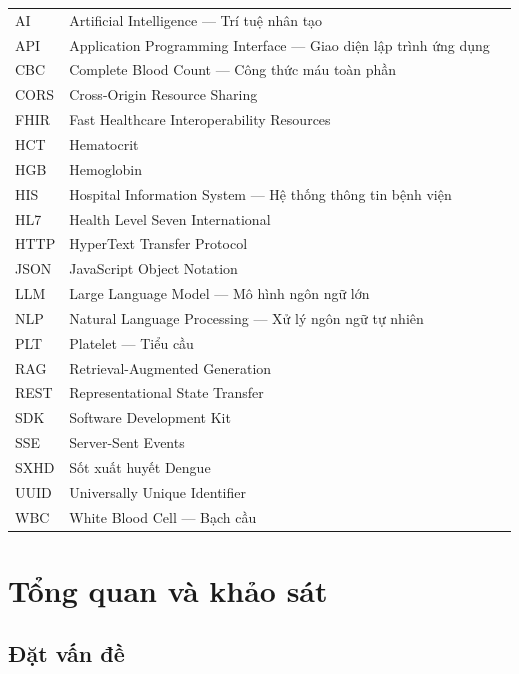 \documentclass[oneside, a4paper]{book}
\theoremstyle{plain}
\theoremstyle{plain}
\theoremstyle{definition}
\theoremstyle{remark}
\begin{document}
\begin{tabular}{@{\hspace{-0.1cm}} l @{\hspace{1.2cm}} p{11.5cm} l}
AI    & Artificial Intelligence --- Trí tuệ nhân tạo \\
API   & Application Programming Interface --- Giao diện lập trình ứng dụng \\
CBC   & Complete Blood Count --- Công thức máu toàn phần \\
CORS  & Cross-Origin Resource Sharing \\
FHIR  & Fast Healthcare Interoperability Resources \\
HCT   & Hematocrit \\
HGB   & Hemoglobin \\
HIS   & Hospital Information System --- Hệ thống thông tin bệnh viện \\
HL7   & Health Level Seven International \\
HTTP  & HyperText Transfer Protocol \\
JSON  & JavaScript Object Notation \\
LLM   & Large Language Model --- Mô hình ngôn ngữ lớn \\
NLP   & Natural Language Processing --- Xử lý ngôn ngữ tự nhiên \\
PLT   & Platelet --- Tiểu cầu \\
RAG   & Retrieval-Augmented Generation \\
REST  & Representational State Transfer \\
SDK   & Software Development Kit \\
SSE   & Server-Sent Events \\
SXHD  & Sốt xuất huyết Dengue \\
UUID  & Universally Unique Identifier \\
WBC   & White Blood Cell --- Bạch cầu \\
\end{tabular}

\listoffigures

\chapter{Tổng quan và khảo sát}

\section{Đặt vấn đề}
\end{document}
